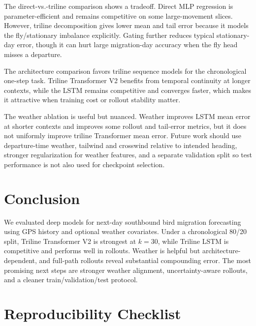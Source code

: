 \documentclass{article}
\begin{document}
The direct-vs.-triline comparison shows a tradeoff. Direct MLP regression is parameter-efficient and remains competitive on some large-movement slices. However, triline decomposition gives lower mean and tail error because it models the fly/stationary imbalance explicitly. Gating further reduces typical stationary-day error, though it can hurt large migration-day accuracy when the fly head misses a departure.

The architecture comparison favors triline sequence models for the chronological one-step task. Triline Transformer V2 benefits from temporal continuity at longer contexts, while the LSTM remains competitive and converges faster, which makes it attractive when training cost or rollout stability matter.

The weather ablation is useful but nuanced. Weather improves LSTM mean error at shorter contexts and improves some rollout and tail-error metrics, but it does not uniformly improve triline Transformer mean error. Future work should use departure-time weather, tailwind and crosswind relative to intended heading, stronger regularization for weather features, and a separate validation split so test performance is not also used for checkpoint selection.

\section{Conclusion}

We evaluated deep models for next-day southbound bird migration forecasting using GPS history and optional weather covariates. Under a chronological 80/20 split, Triline Transformer V2 is strongest at $k=30$, while Triline LSTM is competitive and performs well in rollouts. Weather is helpful but architecture-dependent, and full-path rollouts reveal substantial compounding error. The most promising next steps are stronger weather alignment, uncertainty-aware rollouts, and a cleaner train/validation/test protocol.

\section*{Reproducibility Checklist}
\end{document}
